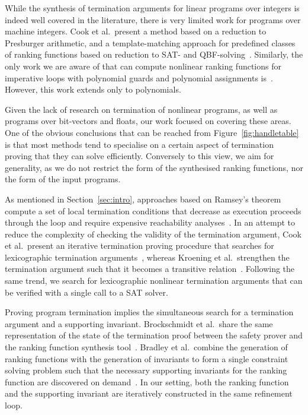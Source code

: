 \documentclass[preprint]{sigplanconf}
\theoremstyle{definition}
\begin{document}
While the synthesis of termination arguments for linear programs over
integers is indeed well covered in the literature, there is very limited
work for programs over machine integers.  Cook et al.~present a method
based on a reduction to Presburger arithmetic, and a template-matching
approach for predefined classes of ranking functions based on reduction to
SAT- and QBF-solving~\cite{DBLP:conf/tacas/CookKRW10}.  Similarly, the only
work we are aware of that can compute nonlinear ranking functions for
imperative loops with polynomial guards and polynomial assignments
is~\cite{DBLP:conf/vmcai/BradleyMS05}.  However, this work extends only to
polynomials.

Given the lack of research on termination of nonlinear programs, as well as
programs over bit-vectors and floats, our work focused on covering these
areas.  One of the obvious conclusions that can be reached from
Figure~\ref{fig:handletable} is that most methods tend to specialise on a
certain aspect of termination proving that they can solve efficiently. 
Conversely to this view, we aim for generality, as we do not restrict the
form of the synthesised ranking functions, nor the form of the input
programs. 



As mentioned in Section~\ref{sec:intro}, approaches based on Ramsey's
theorem compute a set of local termination conditions that decrease as
execution proceeds through the loop and require expensive reachability
analyses~\cite{DBLP:conf/lpe/CodishG03, DBLP:conf/lics/PodelskiR04,
DBLP:conf/pldi/CookPR06}.  In an attempt to reduce the complexity of
checking the validity of the termination argument, Cook et al.~present an
iterative termination proving procedure that searches for lexicographic
termination arguments~\cite{DBLP:conf/tacas/CookSZ13}, whereas Kroening et
al.~strengthen the termination argument such that it becomes a transitive
relation~\cite{DBLP:conf/cav/KroeningSTW10}. Following the same trend, 
we search for lexicographic nonlinear termination arguments that can be verified 
with a single call to a SAT solver. 


Proving program termination implies the simultaneous search for a
termination argument and a supporting invariant.  Brock\-schmidt et
al.~share the same representation of the state of the termination proof
between the safety prover and the ranking function synthesis
tool~\cite{DBLP:conf/cav/BrockschmidtCF13}.  Bradley et al.~combine the
generation of ranking functions with the generation of invariants to form a
single constraint solving problem such that the necessary supporting
invariants for the ranking function are discovered on
demand~\cite{DBLP:conf/cav/BradleyMS05}.  In our setting, both the ranking
function and the supporting invariant are iteratively constructed in the
same refinement loop.
\end{document}
